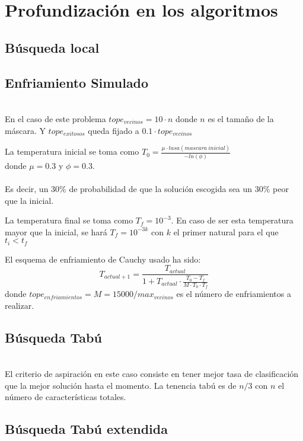 \documentclass[a4paper,11pt]{article}
\begin{document}
\section{Profundización en los algoritmos}
\subsection{Búsqueda local}

\small{\texttt{}}
\normalsize

\subsection{Enfriamiento Simulado}

\small{\texttt{}}
\normalsize\\

En el caso de este problema $tope_{vecinos} = 10\cdot n$ donde $n$ es el tamaño de la máscara.
Y $tope_{exitosos}$ queda fijado a  $0.1\cdot tope_{vecinos}$

La temperatura inicial se toma como $T_{0}=\frac{\mu \cdot tasa(mascara\:inicial)}{-ln(\phi)}$
\\donde $\mu = 0.3$ y $\phi=0.3$. 
\ \\ \ \\
Es decir, un 30\% de probabilidad de que la solución escogida sea
un 30\% peor que la inicial.

La temperatura final se toma como $T_f = 10^{-3}$. En caso de ser esta temperatura mayor que la inicial,
se hará $T_f = 10^{-3k}$ con $k$ el primer natural para el que $t_i < t_f$

El esquema de enfriamiento de Cauchy usado ha sido: 
$$T_{actual+1} = \frac{T_{actual}}{1+T_{actual}\cdot \frac{T_0 - T_f}{M\cdot T_0\cdot T_f}}$$
donde $tope_{enfriamientos}=M = 15000/max_{vecinos}$ es el número de enfriamientos a realizar.  

\subsection{Búsqueda Tabú}

\small{\texttt{}}
\normalsize\\

El criterio de aspiración en este caso consiste en tener mejor tasa de clasificación que la mejor
solución hasta el momento. La tenencia tabú es de $n/3$ con $n$ el número de características totales.

\subsection{Búsqueda Tabú extendida}
\end{document}
